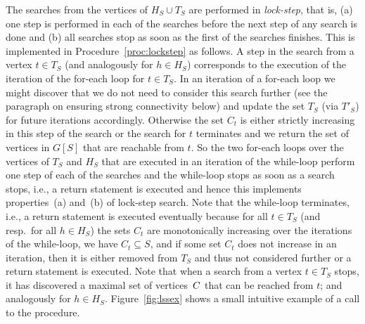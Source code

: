 \vspace{-1mm}
\smallskip{}
The searches from the vertices of $H_S \cup T_S$
are performed in \emph{lock-step}, that is, (a) one step is performed
in each of the searches before the next step of any search is done and (b) all 
searches stop as soon as the first of the searches finishes. 
This is implemented in Procedure~\ref{proc:lockstep} as follows.
A step in the search from a vertex $t \in T_S$ 
(and analogously for $h \in H_S$)
corresponds to the execution of the iteration of the 
for-each loop for $t \in T_S$. In an iteration of a for-each loop 
we might discover that we do not need to consider this search further 
(see the paragraph on ensuring strong connectivity below)
and update the set $T_S$ (via $T'_S$) for future iterations accordingly.
Otherwise the set $C_t$ is either strictly increasing in this step of the 
search or the search for $t$ terminates and we return the set of vertices 
in $G[S]$ that are reachable from $t$.
So the two for-each loops over the vertices of $T_S$ and $H_S$ 
that are executed in an iteration of the while-loop perform
one step of each of the searches and the while-loop stops as 
soon as a search stops, i.e., a return statement is executed and hence 
this implements properties~(a) and~(b) of lock-step search.
Note that the while-loop terminates, i.e., a return statement is executed
eventually because for all $t \in T_S$ 
(and resp.\ for all $h \in H_S$) the sets $C_t$ are 
monotonically increasing over the iterations of the while-loop, 
we have $C_t \subseteq S$, and if some set $C_t$ does not increase 
in an iteration, then it is either removed from $T_S$ and thus not 
considered further or a return statement is executed. 
Note that when a search from a vertex $t \in T_S$ stops, it has discovered a 
maximal set of vertices~$C$ that can be reached from $t$; and analogously
for $h \in H_S$. Figure~\ref{fig:lssex} shows a small intuitive
example of a call to the procedure.

